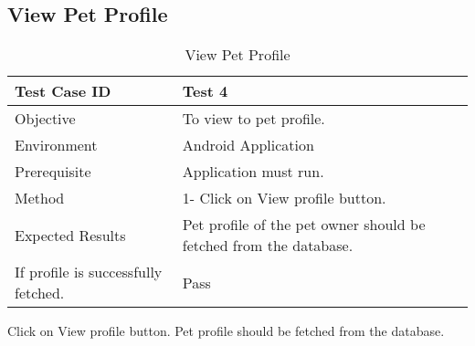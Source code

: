 \newpage
\subsection{View Pet Profile}
\begin{table}[ht]
\centering
\label{View Pet Profile}
\begin{tabular}{|l|l|}
\hline
Test Case ID                        & Test 4                                                       \\ \hline
Objective                           & To view to pet profile.                                       \\ \hline
Environment                         & Android Application                                           \\ \hline
Prerequisite                        & Application must run.                                         \\ \hline
Method                              & 1- Click on View profile button.                              \\ \hline
Expected Results                    & Pet profile of the pet owner should be fetched from the database. \\ \hline
If profile is successfully fetched. & Pass                                                          \\ \hline
\end{tabular}
\caption{View Pet Profile}
\end{table}	
Click on View profile button.  Pet profile should be fetched from the database.

\newpage
